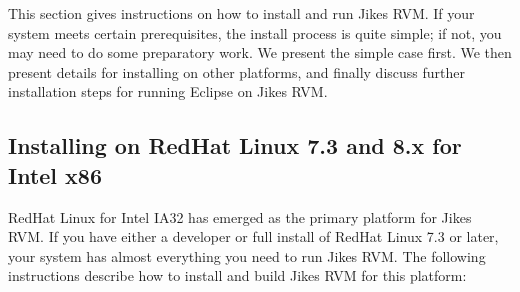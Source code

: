  This section gives instructions on how to install and run Jikes RVM.
If your system meets certain prerequisites, the install process is
quite simple; if not, you may need to do some preparatory work.  We
present the simple case first.  We then present details for installing
on other platforms, and finally discuss further installation steps for
running Eclipse on Jikes RVM.

\subsection{Installing on RedHat Linux 7.3 and 8.x for Intel x86}

RedHat Linux for Intel IA32 has emerged as the 
primary platform for Jikes RVM. 
If you have either a developer or full install of RedHat
Linux 7.3 or later, your system has almost everything you need
to run Jikes RVM.  The following instructions describe how to install
and build Jikes RVM for this platform:
